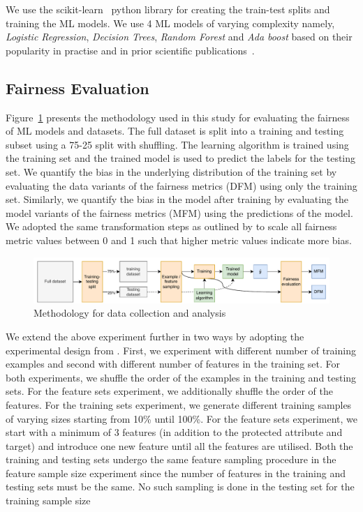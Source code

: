 \documentclass{article}
\begin{document}
We use the scikit-learn \cite{sklearn} python library for creating the
train-test splits and training the ML models. We use 4 ML models of
varying complexity namely, \emph{Logistic Regression}, \emph{Decision
Trees}, \emph{Random Forest} and \emph{Ada boost} based on their
popularity in practise and in prior scientific
publications \cite{zhang2021ignorance,biswas2021fair,biswas2020machine}.

\subsection{Fairness Evaluation}\label{sec:method-fair-eval}

Figure \ref{fig:method} presents the methodology used in this study
for evaluating the fairness of ML models and datasets. The full
dataset is split into a training and testing subset using a 75-25
split with shuffling. The learning algorithm is trained using the
training set and the trained model is used to predict the labels for
the testing set. We quantify the bias in the underlying distribution
of the training set by evaluating the data variants of the fairness
metrics (DFM) using only the training set. Similarly, we quantify the
bias in the model after training by evaluating the model variants of
the fairness metrics (MFM) using the predictions of the model. We
adopted the same transformation steps as outlined by
\citeauthor{zhang2021ignorance} to scale all fairness metric values
between 0 and 1 such that higher metric values indicate more bias.

\begin{figure}
  \centering
  \includegraphics[width=0.95\linewidth]{method.pdf}
  \caption{Methodology for data collection and analysis}
  \label{fig:method}
\end{figure}

We extend the above experiment further in two ways by adopting the
experimental design from \citeauthor{zhang2021ignorance}. First, we
experiment with different number of training examples and second with
different number of features in the training set. For both
experiments, we shuffle the order of the examples in the training and
testing sets. For the feature sets experiment, we additionally shuffle
the order of the features. For the training sets experiment, we
generate different training samples of varying sizes starting from
10\% until 100\%. For the feature sets experiment, we start with a
minimum of 3 features (in addition to the protected attribute and
target) and introduce one new feature until all the features are
utilised. Both the training and testing sets undergo the same feature
sampling procedure in the feature sample size experiment since the
number of features in the training and testing sets must be the same.
No such sampling is done in the testing set for the training sample
size
\end{document}
